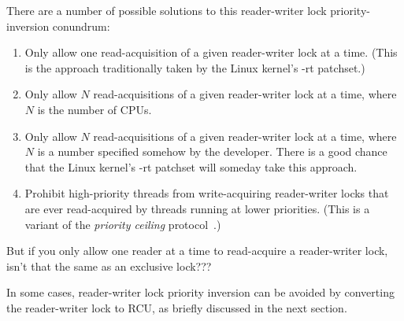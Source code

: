 There are a number of possible solutions to this reader-writer lock
priority-inversion conundrum:

\begin{enumerate}
\item	Only allow one read-acquisition of a given reader-writer lock
	at a time.  (This is the approach traditionally taken by
	the Linux kernel's -rt patchset.)
\item	Only allow $N$ read-acquisitions of a given reader-writer lock
	at a time, where $N$ is the number of CPUs.
\item	Only allow $N$ read-acquisitions of a given reader-writer lock
	at a time, where $N$ is a number specified somehow by the
	developer.
	There is a good chance that the Linux kernel's -rt patchset
	will someday take this approach.
\item	Prohibit high-priority threads from write-acquiring reader-writer
	locks that are ever read-acquired by threads running at lower
	priorities.
	(This is a variant of the \emph{priority ceiling}
	protocol~\cite{LuiSha1990PriorityInheritance}.)
\end{enumerate}

\QuickQuiz{}
	But if you only allow one reader at a time to read-acquire
	a reader-writer lock, isn't that the same as an exclusive
	lock???
 \QuickQuizEnd

In some cases, reader-writer lock priority inversion can be avoided by
converting the reader-writer lock to RCU, as briefly discussed in the
next section.

